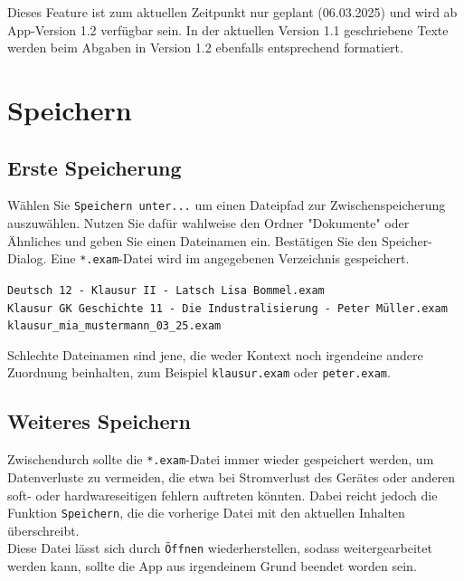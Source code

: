 \documentclass[]{article}
\begin{document}
	
	
		\begin{tcolorbox}[note, title=Hinweis: Versionshinweise]
		Dieses Feature ist zum aktuellen Zeitpunkt nur geplant (06.03.2025) und wird ab App-Version 1.2 verfügbar sein. In der aktuellen Version 1.1 geschriebene Texte werden beim Abgaben in Version 1.2 ebenfalls entsprechend formatiert.
	\end{tcolorbox}
	
	\newpage
	\section{Speichern}
	\subsection{Erste Speicherung}
	Wählen Sie \texttt{Speichern unter...} um einen Dateipfad zur Zwischenspeicherung auszuwählen. Nutzen Sie dafür wahlweise den Ordner "Dokumente" oder Ähnliches und geben Sie einen Dateinamen ein. Bestätigen Sie den Speicher-Dialog. Eine \texttt{*.exam}-Datei wird im angegebenen Verzeichnis gespeichert. 
	
	\begin{tcolorbox}[example, title=Beispiel: Dateinamen]
		\hspace*{15pt}\texttt{Deutsch 12 - Klausur II - Latsch Lisa Bommel.exam}\\
		\hspace*{15pt}\texttt{Klausur GK Geschichte 11 - Die Industralisierung - Peter Müller.exam}\\
		\hspace*{15pt}\texttt{klausur\_mia\_mustermann\_03\_25.exam}
	\end{tcolorbox}
	
	\begin{tcolorbox}[antiexample, title=\color{white}{Gegenbeispiel: Schlechte Dateinamen}]
		Schlechte Dateinamen sind jene, die weder Kontext noch irgendeine andere Zuordnung beinhalten, zum Beispiel \texttt{klausur.exam} oder \texttt{peter.exam}.
	\end{tcolorbox}
	
	\subsection{Weiteres Speichern}
	Zwischendurch sollte die \texttt{*.exam}-Datei immer wieder gespeichert werden, um Datenverluste zu vermeiden, die etwa bei Stromverlust des Gerätes oder anderen soft- oder hardwareseitigen fehlern auftreten könnten. Dabei reicht jedoch die Funktion \texttt{Speichern}, die die vorherige Datei mit den aktuellen Inhalten überschreibt. \\
	Diese Datei lässt sich durch \texttt{Öffnen} wiederherstellen, sodass weitergearbeitet werden kann, sollte die App aus irgendeinem Grund beendet worden sein.
	
\end{document}
